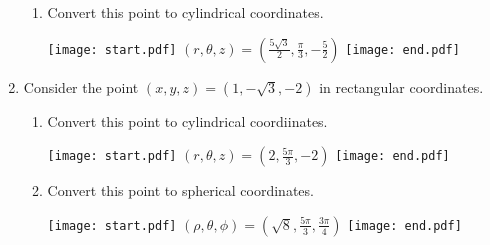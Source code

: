 \documentclass[12pt]{article}
\begin{document}
\begin{enumerate}
\begin{enumerate}
\item Convert this point to cylindrical coordinates.

\texttt{[image: start.pdf]}
{{$(r, \theta, z)=\left(\frac{5\sqrt{3}}{2}, \frac{\pi}{3}, -\frac{5}{2}\right)$}}
\texttt{[image: end.pdf]}


\end{enumerate}

\item Consider the point $(x,y,z)=\left(1, -\sqrt{3}, -2\right)$ in rectangular coordinates.

\begin{enumerate}

\item Convert this point to cylindrical coordiinates.

\texttt{[image: start.pdf]}
{{$(r, \theta, z)=\left(2, \frac{5\pi}{3}, -2\right)$}}
\texttt{[image: end.pdf]}


\item Convert this point to spherical coordinates.

\texttt{[image: start.pdf]}
{{$(\rho, \theta, \phi)=\left(\sqrt{8}, \frac{5\pi}{3}, \frac{3\pi}{4}\right)$}}
\texttt{[image: end.pdf]}


\end{enumerate}

\end{enumerate}

\newpage

\end{document}

